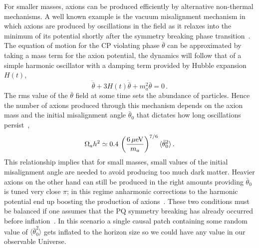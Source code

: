 For smaller masses, axions can be produced efficiently by alternative non-thermal mechanisms. A well known example is the vacuum misalignment mechanism in which axions are produced by oscillations in the field as it relaxes into the minimum of its potential shortly after the symmetry breaking phase transition~\cite{Abbott:1982af,Dine:1982ah,Preskill:1982cy}. The equation of motion for the CP violating phase $\bar{\theta}$ can be approximated by taking a mass term for the axion potential, the dynamics will follow that of a simple harmonic oscillator with a damping term provided by Hubble expansion $H(t)$,
\begin{equation}
 \ddot{\bar{\theta}} + 3 H(t) \dot{\bar{\theta}} + m_a^2\bar{\theta} = 0\, .
\end{equation}
The rms value of the $\bar{\theta}$ field at some time sets the abundance of particles. Hence the number of axions produced through this mechanism depends on the axion mass and the initial misalignment angle $\bar{\theta}_0$ that dictates how long oscillations persist~\cite{Marsh:2015xka},
\begin{equation}
 \Omega_a h^2 \simeq 0.4 \, \left(\frac{6\,\mu{\rm eV}}{m_a}\right)^{7/6} \langle \bar{\theta}_0^2\rangle \, .
\end{equation}
This relationship implies that for small masses, small values of the initial misalignment angle are needed to avoid producing too much dark matter. Heavier axions on the other hand can still be produced in the right amounts providing $\bar{\theta}_0$ is tuned very close $\pi$; in this regime anharmonic corrections to the harmonic potential end up boosting the production of axions~\cite{Visinelli:2009zm}. These two conditions must be balanced if one assumes that the PQ symmetry breaking has already occurred before inflation~\cite{Preskill:1982cy,Abbott:1982af,Dine:1982ah}. In this scenario a single causal patch containing some random value of $\langle \bar{\theta}_0^2\rangle$ gets inflated to the horizon size so we could have any value in our observable Universe.

